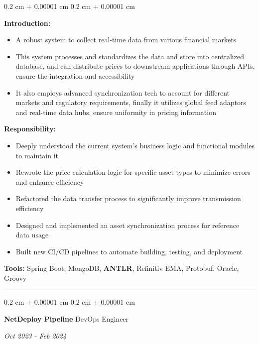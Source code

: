 \documentclass[10pt, letterpaper]{article}
\newenvironment{highlights}{
	\begin{itemize}[
		topsep=0.10 cm,
		parsep=0.10 cm,
		partopsep=0pt,
		itemsep=0pt,
		leftmargin=0.4 cm + 10pt
		]
	}{
	\end{itemize}
} %
\newenvironment{onecolentry}{
	\begin{adjustwidth}{
			0.2 cm + 0.00001 cm
		}{
			0.2 cm + 0.00001 cm
		}
	}{
	\end{adjustwidth}
} %
\newenvironment{twocolentry}[2][]{
	\onecolentry
	\def\secondColumn{#2}
	\setcolumnwidth{\fill, 4.5 cm}
	\begin{paracol}{2}
	}{
		\switchcolumn \raggedleft \secondColumn
	\end{paracol}
	\endonecolentry
} %
\begin{document}
		\vspace{0.10 cm}
		\begin{onecolentry}
			\textbf{Introduction:} 
			\begin{highlights}
				\item A robust system to collect real-time data from various financial markets
				\item This system processes and standardizes the data and store into centralized database, and can distribute prices to downstream applications through APIs, ensure the integration and accessibility
				\item It also employs advanced synchronization tech to account for different markets and regulatory requirements, finally it utilizes global feed adaptors and real-time data hubs, ensure uniformity in pricing information
			\end{highlights}
 			\textbf{Responsibility:} 
			\begin{highlights}
				\item Deeply understood the current system's business logic and functional modules to maintain it 
				\item Rewrote the price calculation logic for specific asset types to minimize errors and enhance efficiency
				\item Refactored the data transfer process to significantly improve transmission efficiency
				\item Designed and implemented an asset synchronization process for reference data usage
				\item Built new CI/CD pipelines to automate building, testing, and deployment				
			\end{highlights}
			\textbf{Tools:} Spring Boot, MongoDB, \textbf{ANTLR}, Refinitiv EMA, Protobuf, Oracle, Groovy
		\end{onecolentry}		
		\vspace{0.4 cm}
		\newpage
		\rule{\textwidth}{0.4pt}
		\vspace{-5pt}
		\begin{twocolentry}{
				\textit{Oct 2023 - Feb 2024}}
				\textbf{NetDeploy Pipeline}
				\space\space\space\space\space\space\space\space\space\space\space\space DevOps Engineer
			\end{twocolentry}
			
\end{document}
